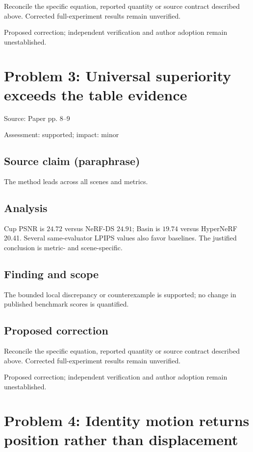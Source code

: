\documentclass[11pt]{article}
\begin{document}
Reconcile the specific equation, reported quantity or source contract described above. Corrected full-experiment results remain unverified.

Proposed correction; independent verification and author adoption remain unestablished.

\section*{Problem 3: Universal superiority exceeds the table evidence}

Source: Paper pp. 8–9

Assessment: supported; impact: minor

\subsection*{Source claim (paraphrase)}

The method leads across all scenes and metrics.

\subsection*{Analysis}

Cup PSNR is \(24.72\) versus NeRF-DS \(24.91\); Basin is \(19.74\) versus HyperNeRF 20.41. Several same-evaluator LPIPS values also favor baselines. The justified conclusion is metric- and scene-specific.

\subsection*{Finding and scope}

The bounded local discrepancy or counterexample is supported; no change in published benchmark scores is quantified.

\subsection*{Proposed correction}

Reconcile the specific equation, reported quantity or source contract described above. Corrected full-experiment results remain unverified.

Proposed correction; independent verification and author adoption remain unestablished.

\section*{Problem 4: Identity motion returns position rather than displacement}
\end{document}
